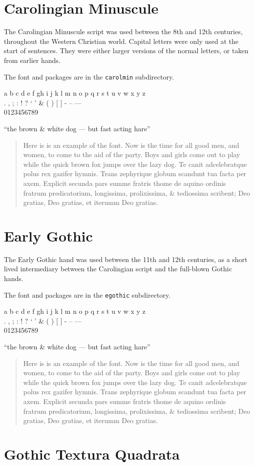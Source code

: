 \documentclass{article}
\newcommand{\abc}{a b c d e f gh i j k l m n o p q r s t u v w x y z}
\newcommand{\punct}{. , ; : ! ? ` ' \& ( ) [ ]}
\newcommand{\figs}{0123456789}
\newcommand{\dashes}{- -- ---}
\newcommand{\ligs}{``the brown \& white dog --- but fast acting hare''}
\newcommand{\sentence}{%
    now is the time for all good
men, and women, to come to the aid of the party while the quick brown fox
jumps over the lazy dog.}
\newcommand{\latin}{%
    Te canit adcelebratque polus rex gazifer hymnis.
Trans zephyrique globum scandunt tua facta per axem.
Explicit secunda pars summe fratris thome de aquino
ordinis fratrum predicatorium, longissima, prolixissima,
\& tediossima scribent; Deo gratias, Deo gratias, et iterumm
Deo gratias.
}
\renewcommand{\sentence}{%
Here is is an example of the font. Now is the time for all good
men, and women, to come to the aid of the party. Boys and girls come
out to play while the quick brown fox jumps over the lazy dog.}
\begin{document}
\clearpage
\section{Carolingian Minuscule}

    The Carolingian Minuscule script was used between the 8th and 12th centuries,
throughout the Western Christian world.
Capital letters were only used at the start of sentences. 
They were either larger versions of the normal letters, or taken from
earlier hands.

    The font and packages are in the \texttt{carolmin} subdirectory.

\begin{center}
\cminfamily
\abc \\
\punct{} \dashes \\
\figs 

\ligs\par
\end{center}

\begin{quotation}
\renewcommand{\baselinestretch}{1.1}
\cminfamily
\sentence{} \latin \par
\end{quotation}


\clearpage
\section{Early Gothic}

    The Early Gothic hand was used between the 11th and 12th centuries, as a short lived
intermediary between the Carolingian script and the full-blown Gothic hands.


    The font and packages are in the \texttt{egothic} subdirectory.

\begin{center}
\egothfamily
\abc \\
\punct{} \dashes \\
\figs 

\ligs\par
\end{center}

\begin{quotation}
\renewcommand{\baselinestretch}{1.3}
\egothfamily
\sentence{} \latin \par
\end{quotation}


\clearpage
\section{Gothic Textura Quadrata}
\end{document}
